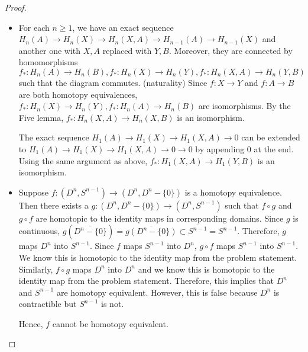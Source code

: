 \documentclass[12pt, psamsfonts]{amsart}
\theoremstyle{definition}
\theoremstyle{remark}
\numberwithin{equation}{section}
\begin{document}
\begin{proof}
  $ $
  \begin{itemize}
    \item
      For each $n \geq 1$, we have an exact sequence $H_n(A) \rightarrow H_n(X) \rightarrow H_n(X, A) \rightarrow H_{n - 1}(A) \rightarrow H_{n - 1}(X)$ and another one with $X, A$ replaced with $Y, B$.
      Moreover, they are connected by homomorphisms $f_*: H_n(A) \rightarrow H_n(B), f_*: H_n(X) \rightarrow H_n(Y), f_*:H_n(X, A) \rightarrow H_n(Y, B)$ such that the diagram commutes. (naturality)
      Since $f: X \rightarrow Y$ and $f: A \rightarrow B$ are both homotopy equivalences, $f_*: H_n(X) \rightarrow H_n(Y), f_*: H_n(A) \rightarrow H_n(B)$ are isomorphisms.
      By the Five lemma, $f_*: H_n(X, A) \rightarrow H_n(X, B)$ is an isomorphism.

      The exact sequence $H_1(A) \rightarrow H_1(X) \rightarrow H_1(X, A) \rightarrow 0$ can be extended to $H_1(A) \rightarrow H_1(X) \rightarrow H_1(X, A) \rightarrow 0 \rightarrow 0$ by appending 0 at the end.
      Using the same argument as above, $f_*: H_1(X, A) \rightarrow H_1(Y, B)$ is an isomorphism.
    \item
      Suppose $f: (D^n, S^{n - 1}) \rightarrow (D^n, D^n - \{ 0 \})$ is a homotopy equivalence.
      Then there exists a $g: (D^n, D^n - \{ 0 \}) \rightarrow (D^n, S^{n - 1})$ such that $f \circ g$ and $g \circ f$ are homotopic to the identity maps in corresponding domains.
      Since $g$ is continuous, $g(\overline{D^n - \{ 0 \}}) = \overline{g(D^n - \{ 0 \})} \subset \overline{S^{n - 1}} = S^{n - 1}$.
      Therefore, $g$ maps $D^n$ into $S^{n - 1}$.
      Since $f$ maps $S^{n - 1}$ into $D^n$, $g \circ f$ maps $S^{n - 1}$ into $S^{n - 1}$.
      We know this is homotopic to the identity map from the problem statement.
      Similarly, $f \circ g$ maps $D^n$ into $D^n$ and we know this is homotopic to the identity map from the problem statement.
      Therefore, this implies that $D^n$ and $S^{n - 1}$ are homotopy equivalent.
      However, this is false because $D^n$ is contractible but $S^{n - 1}$ is not.

      Hence, $f$ cannot be homotopy equivalent.
  \end{itemize}

\end{proof}
\end{document}
